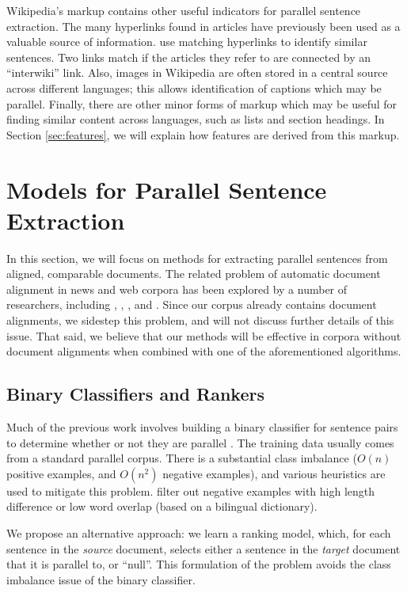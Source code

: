 Wikipedia's markup contains other useful indicators for parallel sentence
extraction.  The many hyperlinks found in articles have previously been used as
a valuable source of information.  \citep{Adafre06} use matching
hyperlinks to identify similar sentences.  Two links match if the articles they
refer to are connected by an ``interwiki'' link.
Also, images in Wikipedia are often stored in a central source across
different languages; this allows identification of captions which may be
parallel.  Finally, there are other minor forms
of markup which may be useful for finding similar content across languages, such
as lists and section headings.  In Section \ref{sec:features}, we will explain
how features are derived from this markup.

\section{Models for Parallel Sentence Extraction}
\label{sec:models} In this section, we will focus on methods for
extracting parallel sentences from aligned, comparable documents.
The related problem of automatic document alignment in news and
web corpora has been explored by a number of researchers,
including
\citet{Resnik03}, \citet{Munteanu05},
\citet{Tillmann09a}, and \citet{Tillmann09b}.
Since our corpus already contains document alignments, we sidestep
this problem, and will not discuss further details of this issue.
That said, we believe that our methods will be effective in
corpora without document alignments when combined with one of the
aforementioned algorithms.


\subsection{Binary Classifiers and Rankers}
Much of the previous work involves building a binary classifier for sentence
pairs to determine whether or not they are parallel
\citep{Munteanu05,Tillmann09a}.
The training data usually comes from a standard parallel corpus.  There is a
substantial class imbalance ($O(n)$ positive examples, and $O(n^2)$
negative examples), and various heuristics are used to mitigate this problem.
\citet{Munteanu05} filter out negative
examples with high length difference or low word overlap (based on a bilingual
dictionary).

We propose an alternative approach: we learn a ranking model, which, for each sentence in the {\em
source} document, selects either a sentence in the {\em target} document that it is
parallel to, or ``null''.
This formulation of the problem avoids the class imbalance issue of the binary classifier.

